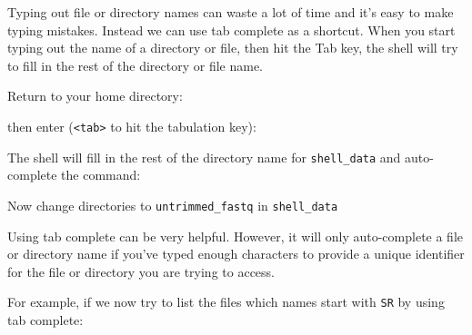\documentclass[
  letterpaper,
  DIV=11,
  numbers=noendperiod]{scrreprt}
\newenvironment{Shaded}{\begin{snugshade}}{\end{snugshade}}
\newcommand{\ExtensionTok}[1]{\textcolor[rgb]{0.00,0.23,0.31}{#1}}
\newcommand{\NormalTok}[1]{\textcolor[rgb]{0.00,0.23,0.31}{#1}}
\newcommand{\OperatorTok}[1]{\textcolor[rgb]{0.37,0.37,0.37}{#1}}
\begin{document}
Typing out file or directory names can waste a lot of time and it's easy
to make typing mistakes. Instead we can use tab complete as a shortcut.
When you start typing out the name of a directory or file, then hit the
Tab key, the shell will try to fill in the rest of the directory or file
name.

Return to your home directory:

\begin{Shaded}
\end{Shaded}

then enter (\texttt{\textless{}tab\textgreater{}} to hit the tabulation
key):

\begin{Shaded}
\end{Shaded}

The shell will fill in the rest of the directory name for
\texttt{shell\_data} and auto-complete the command:

\begin{Shaded}
\end{Shaded}

Now change directories to \texttt{untrimmed\_fastq} in
\texttt{shell\_data}

\begin{Shaded}
\end{Shaded}

Using tab complete can be very helpful. However, it will only
auto-complete a file or directory name if you've typed enough characters
to provide a unique identifier for the file or directory you are trying
to access.

For example, if we now try to list the files which names start with
\texttt{SR} by using tab complete:

\begin{Shaded}
\end{Shaded}
\end{document}
